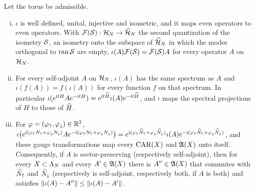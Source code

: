\begin{lemma}\label{lem:embedding}
Let the torus be admissible.
\begin{enumerate}[(i)]
\item $\iota$ is well defined, unital, injective and isometric, and it maps even operators to even
operators. With $\mathcal{F}(\mathcal{S}):\mathcal{H}_N\to\widehat{\mathcal{H}}_N$ the second quantization of the isometry $\mathcal{S}$, an isometry onto the
subspace of $\widehat{\mathcal{H}}_N$ in which the modes orthogonal to $\operatorname{ran}\mathcal{S}$ are empty, $\iota(A)\mathcal{F}(\mathcal{S})=\mathcal{F}(\mathcal{S})A$ for every
operator $A$ on $\mathcal{H}_N$.
\item For every self-adjoint $A$ on $\mathcal{H}_N$, $\iota(A)$ has the same spectrum as $A$ and $\iota(f(A))=f(\iota(A))$
for every function $f$ on that spectrum. In particular
$\iota(e^{\mathrm{i} tH}Ae^{-\mathrm{i} tH})=e^{\mathrm{i} t\widehat{H}}\iota(A)e^{-\mathrm{i} t\widehat{H}}$, and $\iota$ maps the spectral projections of
$H$ to those of $\widehat{H}$.
\item For $\varphi=(\varphi_{\uparrow},\varphi_{\downarrow})\in\mathbb{R}^2$,
$\iota\bigl(e^{\mathrm{i}(\varphi_{\uparrow}N_{\uparrow}+\varphi_{\downarrow}N_{\downarrow})}Ae^{-\mathrm{i}(\varphi_{\uparrow}N_{\uparrow}+\varphi_{\downarrow}N_{\downarrow})}\bigr)
=e^{\mathrm{i}(\varphi_{\uparrow}\widehat{N}_{{\uparrow}}+\varphi_{\downarrow}\widehat{N}_{{\downarrow}})}\iota(A)e^{-\mathrm{i}(\varphi_{\uparrow}\widehat{N}_{{\uparrow}}+\varphi_{\downarrow}\widehat{N}_{{\downarrow}})}$, and these
gauge transformations map every $\mathrm{CAR}(X)$ and $\mathfrak{A}(X)$ onto itself. Consequently, if $A$ is
sector-preserving (respectively self-adjoint), then for every $X\subset\Lambda_N$ and every $A'\in\mathfrak{A}(X)$ there is
$A''\in\mathfrak{A}(X)$ that commutes with $\widehat{N}_{{\uparrow}}$ and $\widehat{N}_{{\downarrow}}$ (respectively is self-adjoint, respectively both, if
$A$ is both) and satisfies $\lVert\iota(A)-A''\rVert\le\lVert\iota(A)-A'\rVert$.
\end{enumerate}
\end{lemma}


